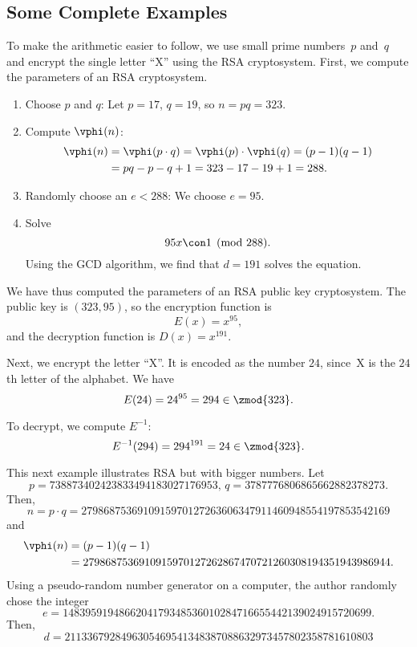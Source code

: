\subsection{Some Complete Examples}
To make the arithmetic easier to follow, we use small prime numbers~$p$
and~$q$ and encrypt the single letter ``X'' using the RSA cryptosystem.
First, we compute the parameters of an RSA cryptosystem.
\begin{enumerate}
\item Choose $p$ and $q$: Let $p=17$, $q=19$, so $n=pq = 323$.
\item Compute $\vphi(n)$:
\begin{align*}
\vphi(n) &= \vphi(p\cdot q) =\vphi(p)\cdot\vphi(q) = (p-1)(q-1)\\
         &= pq-p-q+1 = 323-17-19+1 = 288.
\end{align*}
\item Randomly choose an $e<288$: We choose $e=95$.
\item Solve
$$
  95x \con 1\pmod{288}.
$$
Using the GCD algorithm, we find that $d=191$ solves
the equation.
\end{enumerate}

\noindent{}We have thus computed the parameters of an RSA public key cryptosystem.
The public key is $(323,95)$, so the encryption
function is %
$$
   E(x) = x^{95},
$$
and the decryption function is $D(x) = x^{191}$.

Next, we encrypt the letter ``X''.  It is encoded as the number
$24$, since~X is the $24$th letter of the alphabet.
We have
$$
  E(24) = 24^{95} = 294 \in \zmod{323}.
$$

To decrypt, we compute $E^{-1}$:
$$
  E^{-1}(294) = 294^{191} = 24 \in \zmod{323}.
$$

This next example illustrates RSA but with bigger numbers.
Let
$$
 p=738873402423833494183027176953, \, q=3787776806865662882378273.
$$
Then,
$$
 n=p\cdot q = 2798687536910915970127263606347911460948554197853542169
$$
and
\begin{align*}
\vphi(n)&=(p-1)(q-1)\\
&=
 2798687536910915970127262867470721260308194351943986944.
\end{align*}
Using a pseudo-random number generator on a computer, the
author randomly chose the integer
$$
  e=1483959194866204179348536010284716655442139024915720699.
$$
Then,
$$
  d = 2113367928496305469541348387088632973457802358781610803
$$


